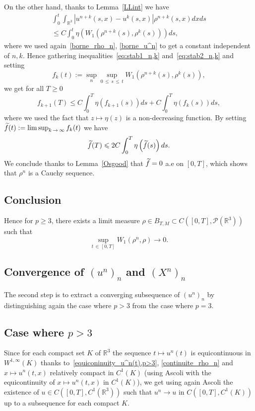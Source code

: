 \documentclass[AHL,Unicode,longabstracts,published]{cedram}
\newcommand{\R}{\mathbb{R}}
\newcommand{\clP}{\mathcal{P}}
\renewcommand{\leq}{\leqslant}
\renewcommand{\geq}{\geqslant}
\let\oldtilde\tilde
\renewcommand*{\tilde}[1]{\mathchoice{\widetilde{#1}}{\widetilde{#1}}{\oldtilde{#1}}{\oldtilde{#1}}}
\begin{document}
On the other hand, thanks to Lemma~\ref{LLint} we have
\begin{multline}\label{eq:stab2_n,k}
\int_0^t \int_{\R^3} \left|u^{n+k}(s,x)-u^{k}(s,x)\right|\rho^{n+k}(s,x) dx ds\\
\leq C \int_0^t \eta \left(W_1\left(\rho^{n+k}(s),\rho^{k}(s)\right) \right)ds,
\end{multline}
where we used again~\eqref{borne_rho_n}, \eqref{borne_u^n} to get a constant independent of $n,k$. Hence gathering inequalities~\eqref{eq:stab1_n,k} and~\eqref{eq:stab2_n,k} and setting
\[
f_{k}(t):=\mathop{\sup}_n
\mathop{\sup}_{0\,\leq\,s\,\leq\,t} W_1\left(\rho^{n+k}(s),\rho^{k}(s)\right),
\]
we get for all $T\geq 0$
\[
f_{k+1}(T) \leq C \int_0^T \eta\left(f_{k+1}(s)\right)ds+ C\int_0^T \eta\left(f_k(s)\right) ds,
\]
where we used the fact that $z \mapsto \eta(z)$ is a non-decreasing function. By setting $\tilde{f}(t):={\limsup}_{k\,\to\,\infty}\,f_k(t) $ we have
\[
\tilde{f}(T) \leq 2 C \int_0^T \eta\left(\tilde{f}(s)\right) ds.
\]
We conclude thanks to Lemma~\ref{Osgood} that $\tilde{f}=0 $ a.e on $[0,T]$, which shows that $ \rho^n$ is a Cauchy sequence.


\subsection*{Conclusion}
Hence for $p\geq 3$, there exists a limit measure $\rho \in B_{T,M}\subset C([0,T],\clP(\R^3))$ such that
\[
\underset{t\,\in\,[0,T]}{\sup} W_1(\rho^n,\rho)\to 0.
\]



\subsection{Convergence of \texorpdfstring{$(u^n)_n$}{(un)n} and \texorpdfstring{$(X^n)_n$}{(Xn)n}}

The second step is to extract a converging subsequence of $(u^n)_n$ by distinguishing again the case where $p>3$ from the case where $p=3$.

\subsection*{Case where \texorpdfstring{$p>3$}{p>3}}

Since for each compact set $K$ of $\R^3$ the sequence $ t \mapsto u^n(t)$ is equicontinuous in $W^{1,\infty}(K) $ thanks to~\eqref{equiconinuity_u^n(t),p>3}, \eqref{continuite_rho_n} and $x\mapsto u^n(t,x)$ relatively compact in $ C^1(K) $ (using Ascoli with the equicontinuity of $x\mapsto u^n(t,x)$ in $ C^1(K)$), we get using again Ascoli the existence of $u\in C([0,T], C^1(\R^3))$ such that $u^n \to u $ in $C([0,T], C^1(K))$ up to a subsequence for each compact $K$.
\end{document}
